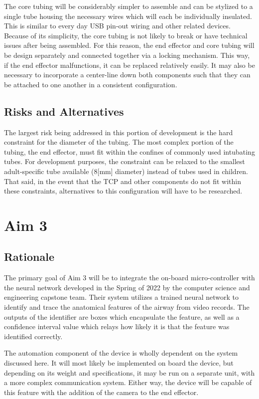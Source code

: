 The core tubing will be considerably simpler to assemble and can be stylized to a single tube housing the necessary wires which will each be individually insulated. This is similar to every day USB pin-out wiring and other related devices. Because of its simplicity, the core tubing is not likely to break or have technical issues after being assembled. For this reason, the end effector and core tubing will be design separately and connected together via a locking mechanism. This way, if the end effector malfunctions, it can be replaced relatively easily. It may also be necessary to incorporate a center-line down both components such that they can be attached to one another in a consistent configuration.

\subsection{Risks and Alternatives}

The largest risk being addressed in this portion of development is the hard constraint for the diameter of the tubing. The most complex portion of the tubing, the end effector, must fit within the confines of commonly used intubating tubes. For development purposes, the constraint can be relaxed to the smallest adult-specific tube available (8[mm] diameter) instead of tubes used in children. That said, in the event that the TCP and other components do not fit within these constraints, alternatives to this configuration will have to be researched.

\section{Aim 3}

\subsection{Rationale}

The primary goal of Aim 3 will be to integrate the on-board micro-controller with the neural network developed in the Spring of 2022 by the computer science and engineering capstone team. Their system utilizes a trained neural network to identify and trace the anatomical features of the airway from video records. The outputs of the identifier are boxes which encapsulate the feature, as well as a confidence interval value which relays how likely it is that the feature was identified correctly.

The automation component of the device is wholly dependent on the system discussed here. It will most likely be implemented on board the device, but depending on its weight and specifications, it may be run on a separate unit, with a more complex communication system. Either way, the device will be capable of this feature with the addition of the camera to the end effector.

